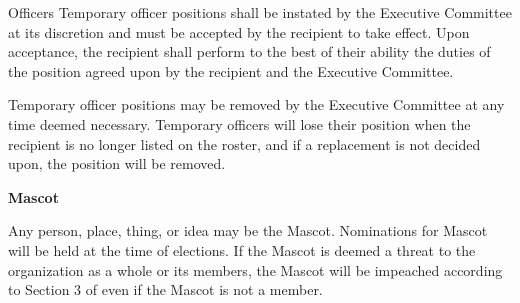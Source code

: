 {\begin{article}{Officers}
	Temporary officer positions shall be instated by the Executive Committee at its discretion and must be accepted by the recipient to take effect.  Upon acceptance, the recipient shall perform to the best of their ability the duties of the position agreed upon by the recipient and the Executive Committee.

	Temporary officer positions may be removed by the Executive Committee at any time deemed necessary.  Temporary officers will lose their position when the recipient is no longer listed on the roster, and if a replacement is not decided upon, the position will be removed.
	\item \textbf{Mascot}

	Any person, place, thing, or idea may be the Mascot.  Nominations for Mascot will be held at the time of elections.  If the Mascot is deemed a threat to the organization as a whole or its members, the Mascot will be impeached according to Section 3 of  even if the Mascot is not a member.
\end{article}
}